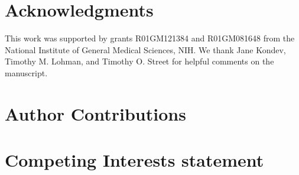 \section*{Acknowledgments}

This work was supported by grants R01GM121384 and R01GM081648 from the National Institute of General Medical Sciences, NIH.  We thank Jane Kondev, Timothy M. Lohman, and Timothy O. Street for helpful comments on the manuscript.

\section*{Author Contributions}


\section*{Competing Interests statement}

